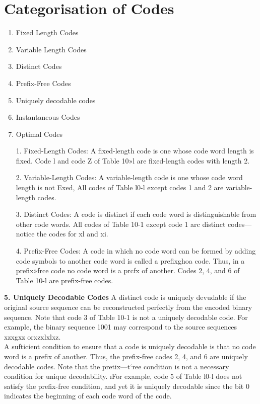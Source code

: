 


\section{Categorisation of Codes}
\begin{enumerate}
\item Fixed Length Codes
\item Variable Length Codes
\item Distinct Codes
\item Prefix-Free Codes
\item Uniquely decodable codes
\item Instantaneous Codes
\item Optimal Codes
\end{enumerate}


\begin{itemize}
\item[1.] Fixed-Length Codes: A fixed-length code is one whose code word length is fixed. Code l and code Z of Table 10»l are
fixed-length codes with length 2.
\item[2.] Variable-Length Codes: A variable-length code is one whose code word length is not Exed, All codes of Table l0-l except
codes 1 and 2 are variable-length codes.
\item[3.] Distinct Codes:
A code is distinct if each code word is distinguishable from other code words. All codes of Table
10-1 except code 1 arc distinct codes—notice the codes for xl and xi.
\item[4.] Prefix-Free Codes:
A code in which no code word can be formed by adding code symbols to another code word is
called a prefixghoa code. Thus, in a prefix»frce code no code word is a prcfx of another. Codes 2, 4,
and 6 of Table 10-l are prefix-free codes.
\end{itemize}



\textbf{5. Uniquely Decodable Codes}
A distinct code is uniquely devudable if the original source sequence can be reconstructed perfectly
from the encoded binary sequence. Note that code 3 of Table 10-1 is not a uniquely decodable code.
For example, the binary sequence 1001 may correspond to the source sequences xzxgxz orxzxlxlxz.
\\ \bigskip
A sufticient condition to ensure that a code is uniquely decodable is that no code word is a prefix of
another. Thus, the prefix-free codes 2, 4, and 6 are uniquely decodable codes. Note that the pretix—t`ree
condition is not a necessary condition for unique decodability. \i\bigskip For example, code 5 of Table l0-l does
not satisfy the prefix-free condition, and yet it is uniquely decodable since the bit 0 indicates the
beginning of each code word of the code.

